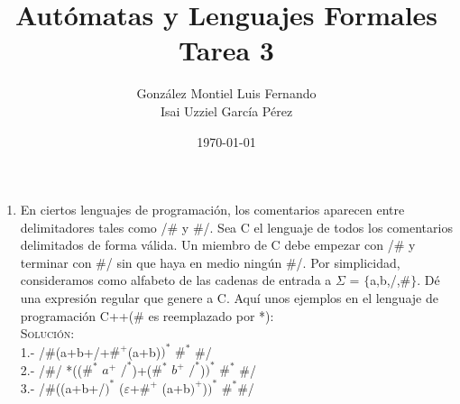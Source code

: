 \documentclass[letterpaper,10pt]{article}
\title{Autómatas y Lenguajes Formales \\ Tarea 3}
\author{González Montiel Luis Fernando \\
        Isai Uzziel García Pérez }
\date{\today}
\begin{document}
\maketitle

\begin{enumerate}

    \item En ciertos lenguajes de programación, los comentarios aparecen entre delimitadores tales
como /\# y \#/. Sea C el lenguaje de todos los comentarios delimitados de forma válida. Un miembro
de C debe empezar con /\# y terminar con \#/ sin que haya en medio ningún \#/. Por simplicidad,
consideramos como alfabeto de las cadenas de entrada a $\Sigma$ = $\lbrace$a,b,/,\#$\rbrace$. Dé una expresión regular
que genere a C. Aquí unos ejemplos en el lenguaje de programación C++(\# es reemplazado por *): \\
	
    \textsc{Solución:}
    \\
    1.- /\#(a+b+/+$\#^{+}$(a+b)$)^{*}$ $\#^{*}$ \#/ \\
    2.- /\#/ *(($\#^{*}$ $a^{+}$ $/^{*}$)+($\#^{*}$ $b^{+}$ $/^{*}$)$)^{*}$ $\#^{*}$ \#/ \\
    3.- /\#((a+b+/$)^{*}$ ($\varepsilon$+$\#^{+}$ (a+b$)^{+}$)$)^{*}$ $\#^{*}$\#/
    
 \end{enumerate}
\end{document}
